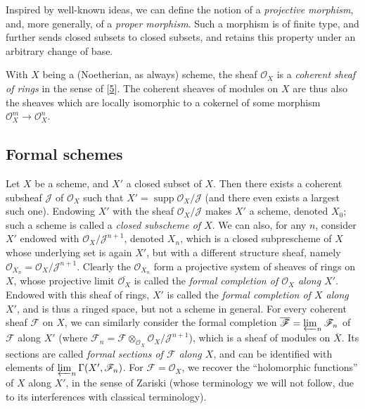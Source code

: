\documentclass{article}
\newcommand{\oldpage}[1]{\marginpar{\footnotesize$\Big\vert$ \textit{p.~#1}}}
\theoremstyle{definition}
\theoremstyle{definition}
\theoremstyle{definition}
\theoremstyle{definition}
\theoremstyle{remark}
\begin{document}
\oldpage{182-03}Inspired by well-known ideas, we can define the notion of a \emph{projective morphism}, and, more generally, of a \emph{proper morphism}.
Such a morphism is of finite type, and further sends closed subsets to closed subsets, and retains this property under an arbitrary change of base.

With \(X\) being a (Noetherian, as always) scheme, the sheaf \({\mathscr{O}}_X\) is a \emph{coherent sheaf of rings} in the sense of {[}\protect\hyperlink{ref-Gro1960}{5}{]}.
The coherent sheaves of modules on \(X\) are thus also the sheaves which are locally isomorphic to a cokernel of some morphism \({\mathscr{O}}_X^m\to{\mathscr{O}}_X^n\).

\hypertarget{fga-2-section-2}{%
\subsection{Formal schemes}\label{fga-2-section-2}}

Let \(X\) be a scheme, and \(X'\) a closed subset of \(X\).
Then there exists a coherent subsheaf \({\mathscr{J}}\) of \({\mathscr{O}}_X\) such that \(X'=\operatorname{supp}{\mathscr{O}}_X/{\mathscr{J}}\) (and there even exists a largest such one).
Endowing \(X'\) with the sheaf \({\mathscr{O}}_X/{\mathscr{J}}\) makes \(X'\) a scheme, denoted \(X_0\);
such a scheme is called a \emph{closed subscheme of \(X\)}.
We can also, for any \(n\), consider \(X'\) endowed with \({\mathscr{O}}_X/{\mathscr{J}}^{n+1}\), denoted \(X_n\), which is a closed subprescheme of \(X\) whose underlying set is again \(X'\), but with a different structure sheaf, namely \({\mathscr{O}}_{X_n}={\mathscr{O}}_X/{\mathscr{J}}^{n+1}\).
Clearly the \({\mathscr{O}}_{X_n}\) form a projective system of sheaves of rings on \(X\), whose projective limit \(\overline{{\mathscr{O}}_X}\) is called the \emph{formal completion of \({\mathscr{O}}_X\) along \(X'\)}.
Endowed with this sheaf of rings, \(X'\) is called the \emph{formal completion of \(X\) along \(X'\)}, and is thus a ringed space, but not a scheme in general.
For every coherent sheaf \({\mathscr{F}}\) on \(X\), we can similarly consider the formal completion \(\overline{{\mathscr{F}}}=\varprojlim_n{\mathscr{F}}_n\) of \({\mathscr{F}}\) along \(X'\) (where \({\mathscr{F}}_n={\mathscr{F}}\otimes_{{\mathscr{O}}_X}{\mathscr{O}}_X/{\mathscr{J}}^{n+1}\)), which is a sheaf of modules on \(\overline{X}\).
Its sections are called \emph{formal sections of \({\mathscr{F}}\) along \(X\)}, and can be identified with elements of \(\varprojlim_n\Gamma(X',{\mathscr{F}}_n)\).
For \({\mathscr{F}}={\mathscr{O}}_X\), we recover the ``holomorphic functions'' of \(X\) along \(X'\), in the sense of Zariski (whose terminology we will not follow, due to its interferences with classical terminology).
\end{document}

